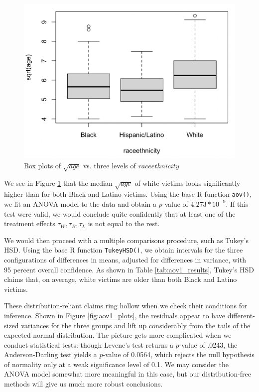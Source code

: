 \begin{figure}[h]
    \centering
    \includegraphics[scale=.4]{boxplot_sqage_raceethnicity.png}
    \caption{Box plots of $\sqrt{age}$ vs. three levels of $raceethnicity$}
    \label{fig:aov1_boxplots}
\end{figure}

\par We see in Figure \ref{fig:aov1_boxplots} that the median $\sqrt{age}$ of white victims looks significantly higher than for both Black and Latino victims. Using the base R function \texttt{aov()}, we fit an ANOVA model to the data and obtain a $p$-value of $4.273*10^{-9}$. If this test were valid, we would conclude quite confidently that at least one of the treatment effects $\tau_{W}, \tau_{B}, \tau_{L}$ is not equal to the rest.

\par \bigskip We would then proceed with a multiple comparisons procedure, such as Tukey's HSD. Using the base R function \texttt{TukeyHSD()}, we obtain intervals for the three configurations of differences in means, adjusted for differences in variance, with 95 percent overall confidence. As shown in Table \ref{tab:aov1_results}, Tukey's HSD claims that, on average, white victims are older than both Black and Latino victims.

\par \bigskip These distribution-reliant claims ring hollow when we check their conditions for inference. Shown in Figure \ref{fig:aov1_plots}, the residuals appear to have different-sized variances for the three groups and lift up considerably from the tails of the expected normal distribution. The picture gets more complicated when we conduct statistical tests: though Levene's test returns a $p$-value of .0243, the Anderson-Darling test yields a $p$-value of 0.0564, which rejects the null hypothesis of normality only at a weak significance level of 0.1. We may consider the ANOVA model somewhat more meaningful in this case, but our distribution-free methods will give us much more robust conclusions.

